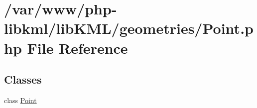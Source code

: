 \hypertarget{Point_8php}{
\section{/var/www/php-\/libkml/libKML/geometries/Point.php File Reference}
\label{d3/dd5/Point_8php}
}
\subsection*{Classes}
\begin{DoxyCompactItemize}
\item 
class \hyperlink{classPoint}{Point}
\end{DoxyCompactItemize}
